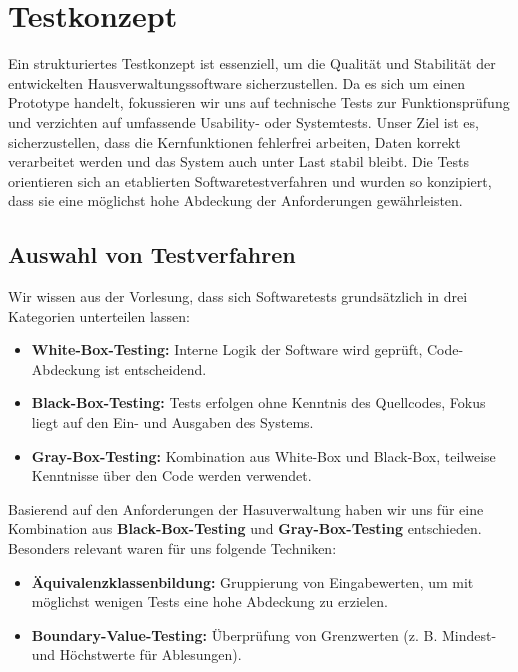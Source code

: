 \section{Testkonzept}\label{Testkonzept}

Ein strukturiertes Testkonzept ist essenziell, um die Qualität und Stabilität der entwickelten Hausverwaltungssoftware sicherzustellen.  
Da es sich um einen Prototype handelt, fokussieren wir uns auf technische Tests zur Funktionsprüfung und verzichten auf umfassende Usability- oder Systemtests.  
Unser Ziel ist es, sicherzustellen, dass die Kernfunktionen fehlerfrei arbeiten, Daten korrekt verarbeitet werden und das System auch unter Last stabil bleibt.  
Die Tests orientieren sich an etablierten Softwaretestverfahren und wurden so konzipiert, dass sie eine möglichst hohe Abdeckung der Anforderungen gewährleisten.\par

\subsection{Auswahl von Testverfahren}

Wir wissen aus der Vorlesung, dass sich Softwaretests grundsätzlich in drei Kategorien unterteilen lassen:

\begin{itemize}
	\item \textbf{White-Box-Testing:} Interne Logik der Software wird geprüft, Code-Abdeckung ist entscheidend.
	\item \textbf{Black-Box-Testing:} Tests erfolgen ohne Kenntnis des Quellcodes, Fokus liegt auf den Ein- und Ausgaben des Systems.
	\item \textbf{Gray-Box-Testing:} Kombination aus White-Box und Black-Box, teilweise Kenntnisse über den Code werden verwendet.
\end{itemize}

Basierend auf den Anforderungen der Hasuverwaltung haben wir uns für eine Kombination aus \textbf{Black-Box-Testing} und \textbf{Gray-Box-Testing} entschieden.
Besonders relevant waren für uns folgende Techniken:
\begin{itemize}
	\item \textbf{Äquivalenzklassenbildung:} Gruppierung von Eingabewerten, um mit möglichst wenigen Tests eine hohe Abdeckung zu erzielen.
	\item \textbf{Boundary-Value-Testing:} Überprüfung von Grenzwerten (z. B. Mindest- und Höchstwerte für Ablesungen).
\end{itemize}

